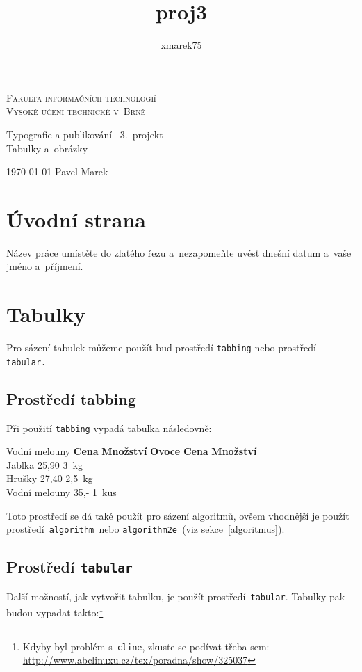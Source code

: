 \documentclass[a4paper, 11pt]{article}
\title{proj3}
\author{xmarek75}
\begin{document}
\begin{titlepage}

\begin{center}
\Huge
\textsc{Fakulta informačních technologií\\
Vysoké učení technické v~Brně} \\

\LARGE
Typografie a publikování\,--\,3.~projekt \\
\Huge
Tabulky a~obrázky
\end{center}

{\Large \today \hfill
Pavel Marek }
\end{titlepage}
\section{Úvodní strana}
Název práce umístěte do zlatého řezu a~nezapomeňte uvést dnešní datum a~vaše jméno a~příjmení.
\section{Tabulky}
Pro sázení tabulek můžeme použít buď prostředí \verb|tabbing| nebo prostředí \verb|tabular.|
\subsection{Prostředí tabbing}
Při použití \verb|tabbing| vypadá tabulka následovně:
\begin{tabbing}
Vodní melouny \quad	\= \textbf{Cena} \quad	\= \textbf{Množství}	\kill 
\textbf{Ovoce} \> \textbf{Cena} \> \textbf{Množství}\\
{Jablka} \> {25,90} \> {3~kg}\\
{Hrušky} \> {27,40} \> {2,5~kg}\\
{Vodní melouny} \> {35,-} \> {1~kus}\\

\end{tabbing}
Toto prostředí se dá také použít pro sázení algoritmů, ovšem vhodnější je použít prostředí\texttt{ algorithm }nebo \texttt{algorithm2e }(viz sekce~\ref{algoritmus}).

\subsection{Prostředí \texttt{tabular}}
Další možností, jak vytvořit tabulku, je použít prostředí\texttt{ tabular}. Tabulky pak 
budou vypadat takto:\footnote{Kdyby byl problém s~\texttt{cline}, zkuste se podívat třeba sem: \href{http://www.abclinuxu.cz/tex/poradna/show/325037}{http://www.abclinuxu.cz/tex/poradna/show/325037}}\\
\end{document}
